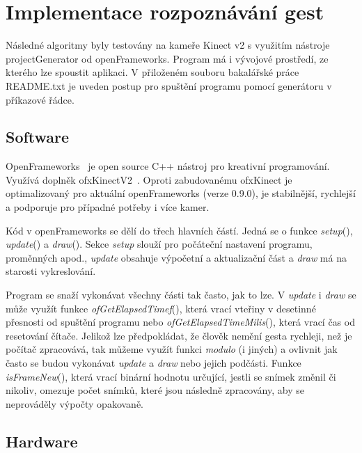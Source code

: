 \chapter{Implementace rozpoznávání gest}
Následné algoritmy byly testovány na kameře Kinect v2 s využitím nástroje  projectGenerator od openFrameworks. Program má i vývojové prostředí, ze kterého lze spoustit aplikaci. V přiloženém souboru bakalářské práce README.txt je uveden postup pro spuštění programu pomocí generátoru v příkazové řádce.

\section{Software}

OpenFrameworks~\cite{1} je open source C++ nástroj pro kreativní programování.\\
Využívá doplněk ofxKinectV2~\cite{2}. Oproti zabudovanému ofxKinect je optimalizovaný pro aktuální openFrameworks (verze 0.9.0), je stabilnější, rychlejší a podporuje pro případné potřeby i více kamer.

Kód v openFrameworks se dělí do třech hlavních částí. Jedná se o funkce \textit{setup}(), \textit{update}() a \textit{draw}(). Sekce \textit{setup} slouží pro počáteční nastavení programu, proměnných apod., \textit{update} obsahuje výpočetní a aktualizační část a \textit{draw} má na starosti vykreslování.

Program se snaží vykonávat všechny části tak často, jak to lze. V \textit{update} i \textit{draw} se může využít funkce \textit{ofGetElapsedTimef}(), která vrací vteřiny v desetinné přesnosti od spuštění programu nebo \textit{ofGetElapsedTimeMilis}(), která vrací čas od resetování čítače. Jelikož lze předpokládat, že člověk nemění gesta rychleji, než je počítač zpracovává, tak můžeme využít funkci \textit{modulo} (i jiných) a ovlivnit jak často se budou vykonávat \textit{update} a \textit{draw} nebo jejich podčásti. Funkce \textit{isFrameNew}(), která vrací binární hodnotu určující, jestli se snímek změnil či nikoliv, omezuje počet snímků, které jsou následně zpracovány, aby se neprováděly výpočty opakovaně.


\section{Hardware}

